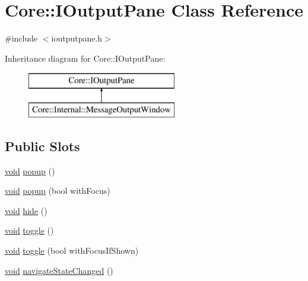 \hypertarget{class_core_1_1_i_output_pane}{\section{\-Core\-:\-:\-I\-Output\-Pane \-Class \-Reference}
\label{class_core_1_1_i_output_pane}
}


{\ttfamily \#include $<$ioutputpane.\-h$>$}

\-Inheritance diagram for \-Core\-:\-:\-I\-Output\-Pane\-:\begin{figure}[H]
\begin{center}
\leavevmode
\includegraphics[height=2.000000cm]{class_core_1_1_i_output_pane}
\end{center}
\end{figure}
\subsection*{\-Public \-Slots}
\begin{DoxyCompactItemize}
\item 
\hyperlink{group___u_a_v_objects_plugin_ga444cf2ff3f0ecbe028adce838d373f5c}{void} \hyperlink{group___core_plugin_ga96646cdb720d2f1a819147ffc22748cb}{popup} ()
\item 
\hyperlink{group___u_a_v_objects_plugin_ga444cf2ff3f0ecbe028adce838d373f5c}{void} \hyperlink{group___core_plugin_ga37eda05403e637a641e31a221f4f16fd}{popup} (bool with\-Focus)
\item 
\hyperlink{group___u_a_v_objects_plugin_ga444cf2ff3f0ecbe028adce838d373f5c}{void} \hyperlink{group___core_plugin_gace5067407c84261c848e18533416a9c7}{hide} ()
\item 
\hyperlink{group___u_a_v_objects_plugin_ga444cf2ff3f0ecbe028adce838d373f5c}{void} \hyperlink{group___core_plugin_ga5b1cac6c84e8ad71438a8b1d42a3295c}{toggle} ()
\item 
\hyperlink{group___u_a_v_objects_plugin_ga444cf2ff3f0ecbe028adce838d373f5c}{void} \hyperlink{group___core_plugin_ga64a1d14b461a93a287ed24c9a058674b}{toggle} (bool with\-Focus\-If\-Shown)
\item 
\hyperlink{group___u_a_v_objects_plugin_ga444cf2ff3f0ecbe028adce838d373f5c}{void} \hyperlink{group___core_plugin_ga1d93873edcf628da2a1db4365f8be494}{navigate\-State\-Changed} ()
\end{DoxyCompactItemize}
